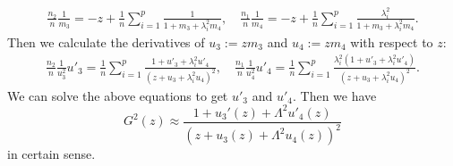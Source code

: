 \begin{align}\label{m34shift}
\frac{n_2}{n}\frac1{m_3} = - z +\frac1n\sum_{i=1}^p \frac1{  1+m_3 + \lambda_i^2m_4  } ,\quad \frac{n_1}{n}\frac1{m_4} = - z +\frac1n\sum_{i=1}^p \frac{\lambda_i^2 }{  1+m_3 + \lambda_i^2m_4  } .
\end{align}
Then we calculate the derivatives of $u_3:=zm_3$ and $u_4:=zm_4$ with respect to $z$:
\begin{align}\label{dotm34}
\frac{n_2}{n}\frac1{u_3^2}u'_3 =  \frac1n\sum_{i=1}^p \frac{1+u'_3 + \lambda_i^2 u'_4}{ ( z+u_3 + \lambda_i^2u_4)^2  } ,\quad \frac{n_1}{n}\frac1{u_4^2}u'_4 =   \frac1n\sum_{i=1}^p \frac{\lambda_i^2\left(1+u'_3 + \lambda_i^2 u'_4\right) }{  (z+u_3 + \lambda_i^2u_4)^2  } .
\end{align}
We can solve the above equations to get $u'_3$ and $u'_4$. Then we have 
$$ G^2(z) \approx   \frac{1 +  u_3'(z) +\Lambda^2 u'_4(z)}{ \left( z+ u_3(z) + \Lambda^2  u_4(z)\right)^2}  $$
{\cob in certain sense}.


